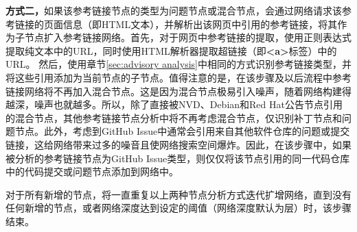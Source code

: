 \textbf{方式二，}如果该参考链接节点的类型为问题节点或混合节点，\tool 会通过网络请求该参考链接的页面信息（即HTML文本），并解析出该网页中引用的参考链接，将其作为子节点扩入参考链接网络。首先，对于网页中参考链接的提取，\tool 使用正则表达式提取纯文本中的URL，同时使用HTML解析器提取超链接（即\textbf{<a>}标签）中的URL。
然后，使用章节\ref{sec:advisory analysis}中相同的方式识别参考链接类型，并将这些引用添加为当前节点的子节点。值得注意的是，在该步骤及以后流程中参考链接网络将不再加入混合节点。这是因为混合节点极易引入噪声，随着网络构建得越深，噪声也就越多。所以，除了直接被NVD、Debian和Red Hat公告节点引用的混合节点，其他参考链接节点分析中将不再考虑混合节点，仅识别补丁节点和问题节点。此外，考虑到GitHub Issue中通常会引用来自其他软件仓库的问题或提交链接，这给网络带来过多的噪音且使网络搜索空间爆炸。因此，在该步骤中，如果被分析的参考链接节点为GitHub Issue类型，则仅仅将该节点引用的同一代码仓库中的代码提交或问题节点添加到网络中。

对于所有新增的节点，\tool 将一直重复以上两种节点分析方式迭代扩增网络，直到没有任何新增的节点，或者网络深度达到设定的阈值（网络深度默认为层）时，该步骤结束。

